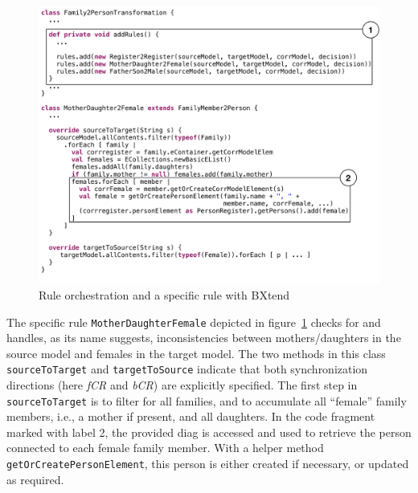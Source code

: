 \begin{figure}[!tbp]
    \centering
    \includegraphics[width=\columnwidth]{diagrams/solutions/bxtendSoln}
    \caption{Rule orchestration and a specific rule with BXtend}
    \label{fig:bxtendSoln}
\end{figure}

The specific rule \texttt{Mother\-Daughter\-Female} depicted in figure~\ref{fig:bxtendSoln} checks for and handles, as its name suggests, inconsistencies between mothers/daughters in the source model and females in the target model.
The two methods in this class \texttt{source\-To\-Target} and \texttt{target\-To\-Source} indicate that both synchronization directions (here \emph{fCR} and \emph{bCR}) are explicitly specified.
The first step in \texttt{source\-To\-Target} is to filter for all families, and to accumulate all ``female'' family members, i.e., a mother if present, and all daughters.
In the code fragment marked with label 2, the provided diag is accessed and used to retrieve the person connected to each female family member.
With a helper method \texttt{get\-Or\-Create\-Person\-Element}, this person is either created if necessary, or updated as required.
